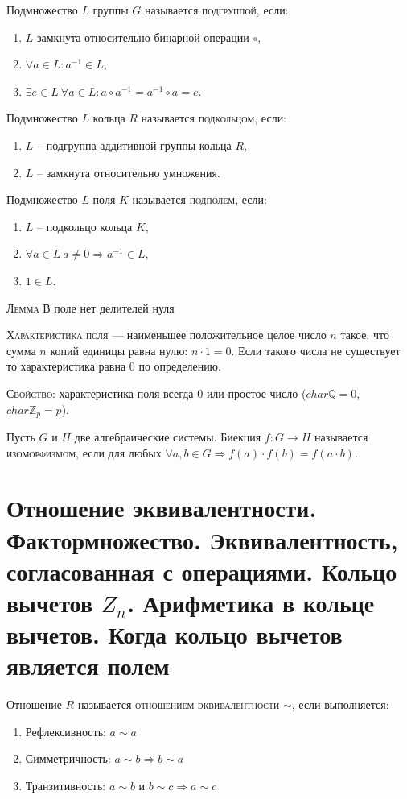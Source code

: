 \documentclass{article}
\begin{document}
Подмножество $L$ группы $G$ называется \textsc{подгруппой}, если:
\begin{enumerate}
    \item $L$ замкнута относительно бинарной операции $\circ$,
    \item $\forall a\in L\colon a^{-1}\in L$,
    \item $\exists e\in L\ \forall a\in L\colon a\circ a^{-1}=a^{-1}\circ a=e$.
\end{enumerate}

Подмножество $L$ кольца $R$ называется \textsc{подкольцом}, если:
\begin{enumerate}
    \item $L$ – подгруппа аддитивной группы кольца $R$,
    \item $L$ – замкнута относительно умножения.
\end{enumerate}

Подмножество $L$ поля $K$ называется \textsc{подполем}, если:
\begin{enumerate}
    \item $L$ – подкольцо кольца $K$,
    \item $\forall a\in L\ a\neq 0\Rightarrow a^{-1}\in L$,
    \item $1\in L$.
\end{enumerate}

\textsc{Лемма} В поле нет делителей нуля

\textsc{Характеристика поля} — наименьшее положительное целое число $n$ такое, что сумма $n$ копий единицы равна нулю:
$n\cdot 1=0$.
Если такого числа не существует то характеристика равна 0 по определению. 

\textsc{Свойство:} характеристика поля всегда 0 или простое число ($char \mathbb{Q}=0$, $char \mathbb{Z}_p=p$).

Пусть ${\displaystyle G\!}$ и ${\displaystyle H\!}$ две алгебраические системы. Биекция ${\displaystyle f:G\to H}$ называется \textsc{изоморфизмом}, если для любых ${\forall a,b\in G\Rightarrow \displaystyle f(a)\cdot f(b)=f(a\cdot b).}$

\section{Отношение эквивалентности. Фактормножество. Эквивалентность, согласованная с операциями. Кольцо вычетов $Z_n$. Арифметика в кольце вычетов. Когда кольцо вычетов является полем}
Отношение $R$ называется \textsc{отношением эквивалентности $\sim$}, если выполняется:
\begin{enumerate}
    \item Рефлексивность: $a\sim a$
    \item Симметричность: $a\sim b\Rightarrow b\sim a$
    \item Транзитивность: $a\sim b$ и $b\sim c\Rightarrow a\sim c$
\end{enumerate}
\end{document}
